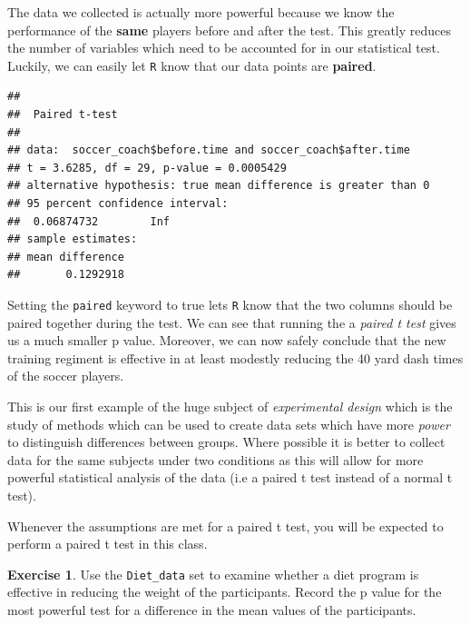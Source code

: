 \documentclass[
]{book}
\newenvironment{Shaded}{\begin{snugshade}}{\end{snugshade}}
\newcommand{\AttributeTok}[1]{\textcolor[rgb]{0.77,0.63,0.00}{#1}}
\newcommand{\ConstantTok}[1]{\textcolor[rgb]{0.00,0.00,0.00}{#1}}
\newcommand{\FunctionTok}[1]{\textcolor[rgb]{0.00,0.00,0.00}{#1}}
\newcommand{\NormalTok}[1]{#1}
\newcommand{\SpecialCharTok}[1]{\textcolor[rgb]{0.00,0.00,0.00}{#1}}
\newcommand{\StringTok}[1]{\textcolor[rgb]{0.31,0.60,0.02}{#1}}
\theoremstyle{definition}
\theoremstyle{definition}
\theoremstyle{definition}
\newtheorem{exercise}{Exercise}[chapter]
\theoremstyle{definition}
\theoremstyle{remark}
\begin{document}
The data we collected is actually more powerful because we know the performance of the \textbf{same} players before and after the test. This greatly reduces the number of variables which need to be accounted for in our statistical test. Luckily, we can easily let \texttt{R} know that our data points are \textbf{paired}.

\begin{Shaded}
\end{Shaded}

\begin{verbatim}
## 
##  Paired t-test
## 
## data:  soccer_coach$before.time and soccer_coach$after.time
## t = 3.6285, df = 29, p-value = 0.0005429
## alternative hypothesis: true mean difference is greater than 0
## 95 percent confidence interval:
##  0.06874732        Inf
## sample estimates:
## mean difference 
##       0.1292918
\end{verbatim}

Setting the \texttt{paired} keyword to true lets \texttt{R} know that the two columns should be paired together during the test. We can see that running the a \emph{paired t test} gives us a much smaller p value. Moreover, we can now safely conclude that the new training regiment is effective in at least modestly reducing the 40 yard dash times of the soccer players.

This is our first example of the huge subject of \emph{experimental design} which is the study of methods which can be used to create data sets which have more \emph{power} to distinguish differences between groups. Where possible it is better to collect data for the same subjects under two conditions as this will allow for more powerful statistical analysis of the data (i.e a paired t test instead of a normal t test).

Whenever the assumptions are met for a paired t test, you will be expected to perform a paired t test in this class.

\begin{exercise}
\protect\hypertarget{exr:unnamed-chunk-561}{}\label{exr:unnamed-chunk-561}Use the \texttt{Diet\_data} set to examine whether a diet program is effective in reducing the weight of the participants. Record the p value for the most powerful test for a difference in the mean values of the participants.
\end{exercise}
\end{document}
